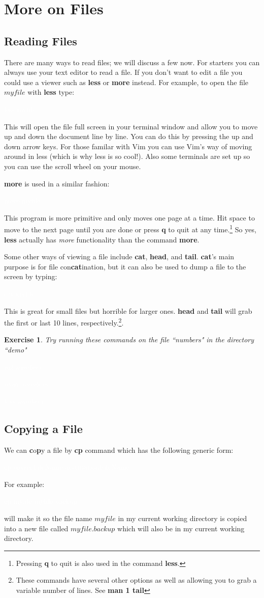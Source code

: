 \documentclass[oneside]{book}
\newcommand{\commandline}[1]{\begin{center} \colorbox{Dark}{\textcolor{white}{#1}} \end{center}}
\newtheorem{ex}{Exercise}[chapter]
\begin{document}
\section{More on Files}

\subsection{Reading Files}
	There are many ways to read files; we will discuss a few now. For starters you can always use your text editor to read a file. If you don't want to edit a file you could use a viewer such as \textbf{less} or \textbf{more} instead.
	For example, to open the file $myfile$ with \textbf{less} type:
\commandline{less myfile}
This will open the file full screen in your terminal window and allow you to move up and down the document line by line. You can do this by pressing the up and down arrow keys. For those familar with Vim you can use Vim's way of moving around in less (which is why less is so cool!). Also some terminals are set up so you can use the scroll wheel on your mouse. 


\textbf{more} is used in a similar fashion:
\commandline{more myfile}
This program is more primitive and only moves one page at a time. Hit space to move to the next page until you are done or press \textbf{q} to quit at any time.\footnote{Pressing \textbf{q} to quit is also used in the command \textbf{less}.} So yes,  \textbf{less} actually has \textit{more} functionality than the command \textbf{more}. 

Some other ways of viewing a file include \textbf{cat}, \textbf{head}, and \textbf{tail}. \textbf{cat}'s main purpose is for file con\textbf{cat}ination, but it can also be used to dump a file to the screen by typing:
\commandline{cat myfile}
This is great for small files but horrible for larger ones. \textbf{head} and \textbf{tail} will grab the first or last 10 lines, respectively.\footnote{These commands have several other options as well as allowing you to grab a variable number of lines. See \textbf{man 1 tail}}.\\

\begin{ex} Try running these commands on the file ``numbers" in the directory ``demo"
\commandline{cat numbers}
\commandline{more numbers}
\commandline{less numbers}

\end{ex}

\subsection{Copying a File}
We can \textbf{c}o\textbf{p}y a file by \textbf{cp} command which has the following generic form:
\commandline{cp sourceFileName destinationFileName}
For example:
\commandline{cp myfile myfile.backup}
will make it so the file name $myfile$ in my current working directory is copied into a new file called $myfile.backup$ which will also be in my current working directory.
\end{document}
